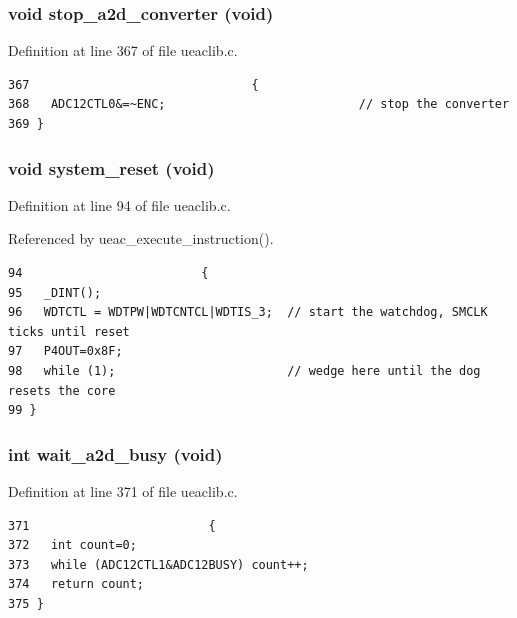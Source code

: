 \subsubsection{\setlength{\rightskip}{0pt plus 5cm}void stop\_\-a2d\_\-converter (void)}\label{ueaclib_8c_a17}




Definition at line 367 of file ueaclib.c.

\footnotesize\begin{verbatim}367                               {
368   ADC12CTL0&=~ENC;                           // stop the converter 
369 }  
\end{verbatim}\normalsize 


\subsubsection{\setlength{\rightskip}{0pt plus 5cm}void system\_\-reset (void)}\label{ueaclib_8c_a12}




Definition at line 94 of file ueaclib.c.

Referenced by ueac\_\-execute\_\-instruction().

\footnotesize\begin{verbatim}94                         {
95   _DINT();
96   WDTCTL = WDTPW|WDTCNTCL|WDTIS_3;  // start the watchdog, SMCLK ticks until reset 
97   P4OUT=0x8F;
98   while (1);                        // wedge here until the dog resets the core
99 }
\end{verbatim}\normalsize 


\subsubsection{\setlength{\rightskip}{0pt plus 5cm}int wait\_\-a2d\_\-busy (void)}\label{ueaclib_8c_a18}




Definition at line 371 of file ueaclib.c.

\footnotesize\begin{verbatim}371                         {
372   int count=0;
373   while (ADC12CTL1&ADC12BUSY) count++;
374   return count;
375 }
\end{verbatim}\normalsize 


